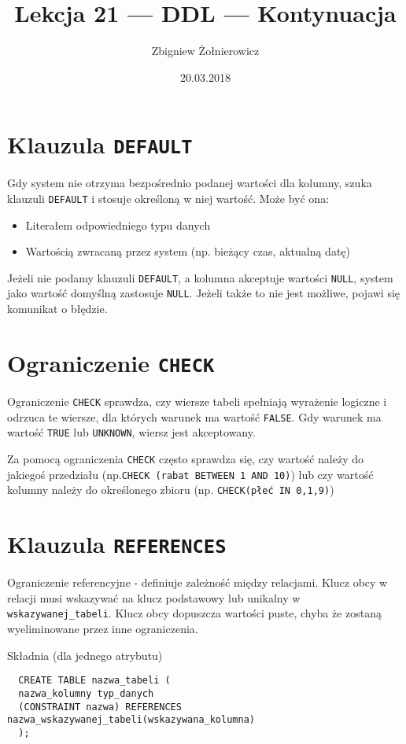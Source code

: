 \documentclass{article}
\begin{document}
\title{Lekcja 21 --- DDL --- Kontynuacja}
\author{Zbigniew Żołnierowicz}
\date{20.03.2018}
\maketitle
\section{Klauzula {\tt DEFAULT}}
Gdy system nie otrzyma bezpośrednio podanej wartości dla kolumny, szuka klauzuli {\tt DEFAULT} i stosuje określoną w niej wartość. Może być ona: 
\begin{itemize}
  \item Literałem odpowiedniego typu danych
  \item Wartością zwracaną przez system (np. bieżący czas, aktualną datę)
\end{itemize}
Jeżeli nie podamy klauzuli {\tt DEFAULT}, a kolumna akceptuje wartości {\tt NULL}, system jako wartość domyślną zastosuje {\tt NULL}. Jeżeli także to nie jest możliwe, pojawi się komunikat o błędzie.
\section{Ograniczenie {\tt CHECK}}
Ograniczenie {\tt CHECK} sprawdza, czy wiersze tabeli spełniają wyrażenie logiczne i odrzuca te wiersze, dla których warunek ma wartość {\tt FALSE}. Gdy warunek ma wartość {\tt TRUE} lub {\tt UNKNOWN}, wiersz jest akceptowany.

Za pomocą ograniczenia {\tt CHECK} często sprawdza się, czy wartość należy do jakiegoś przedziału (np.\texttt{CHECK (rabat BETWEEN 1 AND 10)}) lub czy wartość kolumny należy do określonego zbioru (np. \texttt{CHECK(płeć IN 0,1,9)})
\section{Klauzula {\tt REFERENCES}}
Ograniczenie referencyjne - definiuje zależność między relacjami. Klucz obcy w relacji musi wskazywać na klucz podstawowy lub unikalny w {\tt wskazywanej\_tabeli}.
Klucz obcy dopuszcza wartości puste, chyba że zostaną wyeliminowane przez inne ograniczenia.

Składnia (dla jednego atrybutu)
\begin{verbatim}
  CREATE TABLE nazwa_tabeli (
  nazwa_kolumny typ_danych
  (CONSTRAINT nazwa) REFERENCES nazwa_wskazywanej_tabeli(wskazywana_kolumna)
  );
\end{verbatim}
\end{document}
